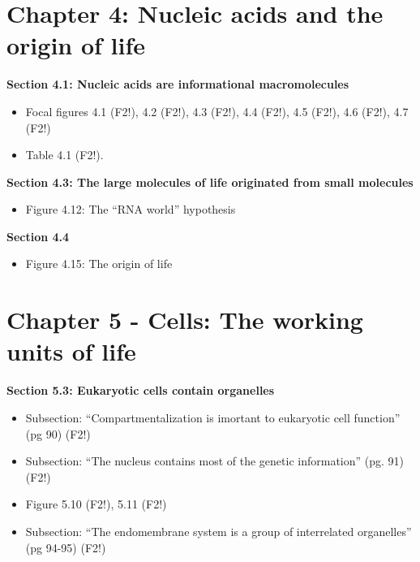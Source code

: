 \documentclass[
]{book}
\providecommand{\tightlist}{%
  \setlength{\itemsep}{0pt}\setlength{\parskip}{0pt}}
\begin{document}
\hypertarget{chapter-4-nucleic-acids-and-the-origin-of-life}{%
\section{Chapter 4: Nucleic acids and the origin of life}\label{chapter-4-nucleic-acids-and-the-origin-of-life}}

\textbf{Section 4.1: Nucleic acids are informational macromolecules}

\begin{itemize}
\tightlist
\item
  Focal figures 4.1 (F2!), 4.2 (F2!), 4.3 (F2!), 4.4 (F2!), 4.5 (F2!), 4.6 (F2!), 4.7 (F2!)
\item
  Table 4.1 (F2!).
\end{itemize}

\textbf{Section 4.3: The large molecules of life originated from small molecules}

\begin{itemize}
\tightlist
\item
  Figure 4.12: The ``RNA world'' hypothesis
\end{itemize}

\textbf{Section 4.4}

\begin{itemize}
\tightlist
\item
  Figure 4.15: The origin of life
\end{itemize}

\hypertarget{chapter-5---cells-the-working-units-of-life}{%
\section{Chapter 5 - Cells: The working units of life}\label{chapter-5---cells-the-working-units-of-life}}

\textbf{Section 5.3: Eukaryotic cells contain organelles}

\begin{itemize}
\tightlist
\item
  Subsection: ``Compartmentalization is imortant to eukaryotic cell function'' (pg 90) (F2!)
\item
  Subsection: ``The nucleus contains most of the genetic information'' (pg. 91) (F2!)
\item
  Figure 5.10 (F2!), 5.11 (F2!)
\item
  Subsection: ``The endomembrane system is a group of interrelated organelles'' (pg 94-95) (F2!)
\end{itemize}
\end{document}
